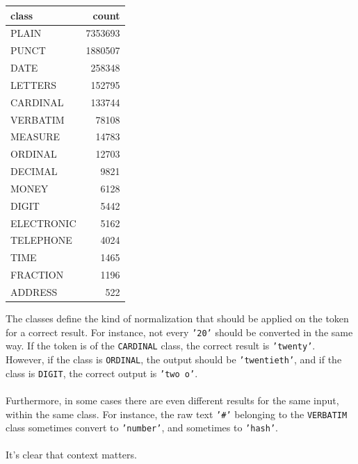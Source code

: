 \documentclass[a4paper, 9pt]{extarticle}
\newcommand{\code}{\texttt}
\newcommand{\str}[1]{\texttt{'#1'}}
\begin{document}
\begin{minipage}{0.35\textwidth}
\small
\begin{tabular}{l|r}
\textbf{class}&\textbf{count}\\ \hline  
PLAIN       & 7353693\\ \hline  
PUNCT       & 1880507\\ \hline  
DATE        &  258348\\ \hline  
LETTERS     &  152795\\\hline
CARDINAL    &  133744\\\hline
VERBATIM    &   78108\\\hline
MEASURE     &   14783\\\hline
ORDINAL     &   12703\\\hline
DECIMAL     &    9821\\\hline
MONEY       &    6128\\\hline
DIGIT       &    5442\\\hline
ELECTRONIC  &    5162\\\hline
TELEPHONE   &    4024\\\hline
TIME        &    1465\\\hline
FRACTION    &    1196\\\hline
ADDRESS     &     522\\
\end{tabular}
\end{minipage}%
\begin{minipage}{0.55\textwidth}
The classes define the kind of normalization that should be applied on the token for a correct result. For instance, not every \str{20} should be converted in the same way. If the token is of the \code{CARDINAL} class, the correct result is \str{twenty}. However, if the class is \code{ORDINAL}, the output should be \str{twentieth}, and if the class is \code{DIGIT}, the correct output is \str{two o}.\\\\
Furthermore, in some cases there are even different results for the same input, within the same class. For instance, the raw text \str{\#} belonging to the \code{VERBATIM} class sometimes convert to \str{number}, and sometimes to \str{hash}.\\\\
It's clear that context matters.
\end{minipage}%
\end{document}

